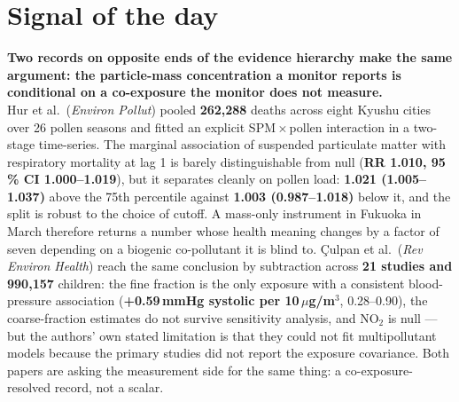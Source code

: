 \documentclass[10pt]{article}
\begin{document}
\vspace{6mm}

\section*{\sffamily\bfseries\color{Deep}Signal of the day}
\vspace{-1.5mm}{\color{Amber}\rule{\linewidth}{1.1pt}}\vspace{2.5mm}

\begin{keybox}
{\sffamily\bfseries\small\color{Deep}Two records on opposite ends of the evidence
hierarchy make the same argument: the particle-mass concentration a monitor reports is
conditional on a co-exposure the monitor does not measure.}\\[1.4mm]
\footnotesize
Hur et al.\ (\textit{Environ Pollut}) pooled \textbf{262{,}288} deaths across eight
Kyushu cities over 26 pollen seasons and fitted an explicit SPM\,$\times$\,pollen
interaction in a two-stage time-series. The marginal association of suspended particulate
matter with respiratory mortality at lag 1 is barely distinguishable from null
(\textbf{RR 1.010, 95\,\% CI 1.000--1.019}), but it separates cleanly on pollen load:
\textbf{1.021 (1.005--1.037)} above the 75th percentile against \textbf{1.003
(0.987--1.018)} below it, and the split is robust to the choice of cutoff. A mass-only
instrument in Fukuoka in March therefore returns a number whose health meaning changes
by a factor of seven depending on a biogenic co-pollutant it is blind to.
Çulpan et al.\ (\textit{Rev Environ Health}) reach the same conclusion by subtraction
across \textbf{21 studies and 990{,}157} children: the fine fraction is the only exposure
with a consistent blood-pressure association (\textbf{+0.59\,mmHg systolic per
10\,$\mu$g/m$^3$}, 0.28--0.90), the coarse-fraction estimates do not survive sensitivity
analysis, and NO$_2$ is null --- but the authors' own stated limitation is that they could
not fit multipollutant models because the primary studies did not report the exposure
covariance. Both papers are asking the measurement side for the same thing: a
co-exposure-resolved record, not a scalar.
\end{keybox}

\vspace{3mm}

\enlargethispage{2\baselineskip}
\end{document}
